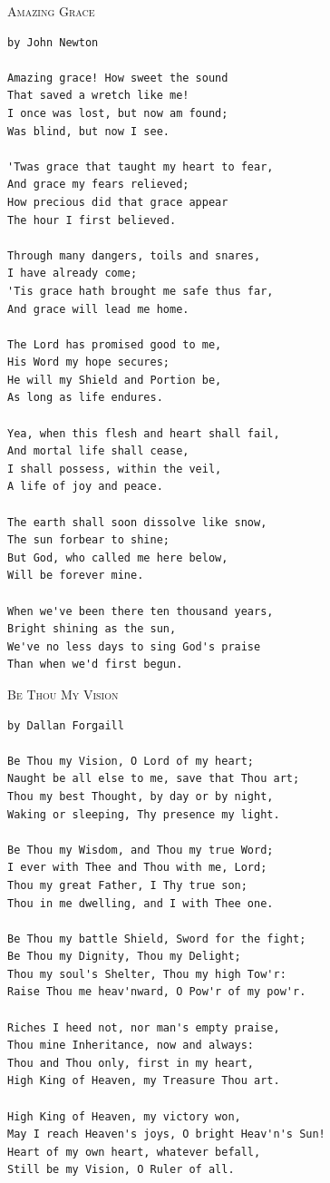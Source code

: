 \documentclass[10pt,oneside,footinclude=true,headinclude=true]{scrbook} %
\newcommand\songtitle[1]{
	\hspace*{-3.7mm}\Large\textsc{#1}
}
\begin{document}
\songtitle{Amazing Grace}
\begin{verbatim}
by John Newton

Amazing grace! How sweet the sound
That saved a wretch like me!
I once was lost, but now am found;
Was blind, but now I see.

'Twas grace that taught my heart to fear,
And grace my fears relieved;
How precious did that grace appear
The hour I first believed.

Through many dangers, toils and snares,
I have already come;
'Tis grace hath brought me safe thus far,
And grace will lead me home.

The Lord has promised good to me,
His Word my hope secures;
He will my Shield and Portion be,
As long as life endures.

Yea, when this flesh and heart shall fail,
And mortal life shall cease,
I shall possess, within the veil,
A life of joy and peace.

The earth shall soon dissolve like snow,
The sun forbear to shine;
But God, who called me here below,
Will be forever mine.

When we've been there ten thousand years,
Bright shining as the sun,
We've no less days to sing God's praise
Than when we'd first begun.
\end{verbatim}


\bigskip
\songtitle{Be Thou My Vision}
\begin{verbatim}
by Dallan Forgaill

Be Thou my Vision, O Lord of my heart;
Naught be all else to me, save that Thou art;
Thou my best Thought, by day or by night,
Waking or sleeping, Thy presence my light.

Be Thou my Wisdom, and Thou my true Word;
I ever with Thee and Thou with me, Lord;
Thou my great Father, I Thy true son;
Thou in me dwelling, and I with Thee one.

Be Thou my battle Shield, Sword for the fight;
Be Thou my Dignity, Thou my Delight;
Thou my soul's Shelter, Thou my high Tow'r:
Raise Thou me heav'nward, O Pow'r of my pow'r.

Riches I heed not, nor man's empty praise,
Thou mine Inheritance, now and always:
Thou and Thou only, first in my heart,
High King of Heaven, my Treasure Thou art.

High King of Heaven, my victory won,
May I reach Heaven's joys, O bright Heav'n's Sun!
Heart of my own heart, whatever befall,
Still be my Vision, O Ruler of all.
\end{verbatim}
\end{document}
